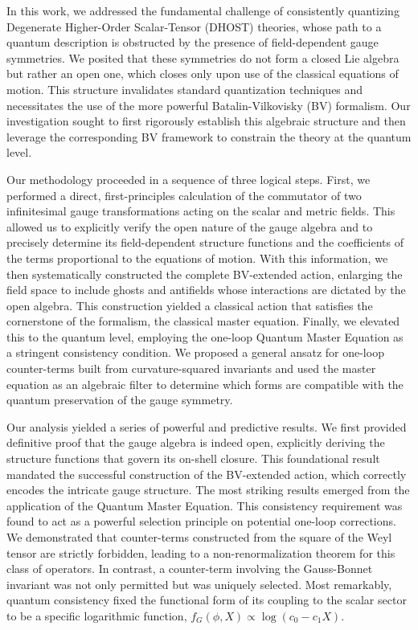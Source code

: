 \documentclass[twocolumn]{aastex631}
\begin{document}
In this work, we addressed the fundamental challenge of consistently quantizing Degenerate Higher-Order Scalar-Tensor (DHOST) theories, whose path to a quantum description is obstructed by the presence of field-dependent gauge symmetries. We posited that these symmetries do not form a closed Lie algebra but rather an open one, which closes only upon use of the classical equations of motion. This structure invalidates standard quantization techniques and necessitates the use of the more powerful Batalin-Vilkovisky (BV) formalism. Our investigation sought to first rigorously establish this algebraic structure and then leverage the corresponding BV framework to constrain the theory at the quantum level.

Our methodology proceeded in a sequence of three logical steps. First, we performed a direct, first-principles calculation of the commutator of two infinitesimal gauge transformations acting on the scalar and metric fields. This allowed us to explicitly verify the open nature of the gauge algebra and to precisely determine its field-dependent structure functions and the coefficients of the terms proportional to the equations of motion. With this information, we then systematically constructed the complete BV-extended action, enlarging the field space to include ghosts and antifields whose interactions are dictated by the open algebra. This construction yielded a classical action that satisfies the cornerstone of the formalism, the classical master equation. Finally, we elevated this to the quantum level, employing the one-loop Quantum Master Equation as a stringent consistency condition. We proposed a general ansatz for one-loop counter-terms built from curvature-squared invariants and used the master equation as an algebraic filter to determine which forms are compatible with the quantum preservation of the gauge symmetry.

Our analysis yielded a series of powerful and predictive results. We first provided definitive proof that the gauge algebra is indeed open, explicitly deriving the structure functions that govern its on-shell closure. This foundational result mandated the successful construction of the BV-extended action, which correctly encodes the intricate gauge structure. The most striking results emerged from the application of the Quantum Master Equation. This consistency requirement was found to act as a powerful selection principle on potential one-loop corrections. We demonstrated that counter-terms constructed from the square of the Weyl tensor are strictly forbidden, leading to a non-renormalization theorem for this class of operators. In contrast, a counter-term involving the Gauss-Bonnet invariant was not only permitted but was uniquely selected. Most remarkably, quantum consistency fixed the functional form of its coupling to the scalar sector to be a specific logarithmic function, $f_G(\phi, X) \propto \log(c_0 - c_1 X)$.
\end{document}
